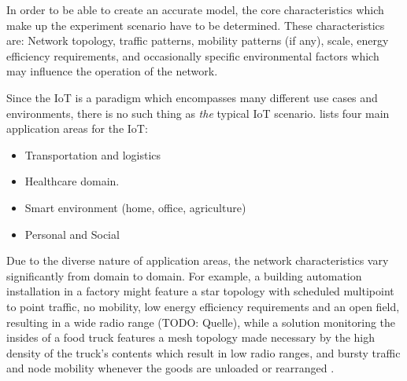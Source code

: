\documentclass{acm_proc_article-sp}
\begin{document}

In order to be able to create an accurate model, the core characteristics which make up the experiment scenario have to be determined. These characteristics are: Network topology, traffic patterns, mobility patterns (if any), scale, energy efficiency requirements, and occasionally specific environmental factors which may influence the operation of the network.

Since the IoT is a paradigm which encompasses many different use cases and environments, there is no such thing as \emph{the} typical IoT scenario. \cite{IoT_survey} lists four main application areas for the IoT:
\begin{itemize}
\item Transportation and logistics
\item Healthcare domain.
\item Smart environment (home, office, agriculture)
\item Personal and Social
\end{itemize}

Due to the diverse nature of application areas, the network characteristics vary significantly from domain to domain.
For example, a building automation installation in a factory might feature a star topology with scheduled multipoint to point traffic, no mobility, low energy efficiency requirements and an open field, resulting in a wide radio range (TODO: Quelle), while a solution monitoring the insides of a food truck features a mesh topology made necessary by the high density of the truck's contents which result in low radio ranges, and bursty traffic and node mobility whenever the goods are unloaded or rearranged \cite{food_monitoring}.
\end{document}

